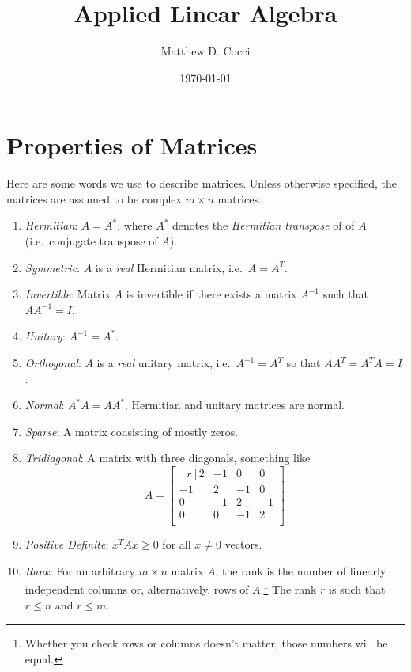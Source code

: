 \documentclass[12pt]{article}
\author{Matthew D. Cocci}
\title{Applied Linear Algebra}
\date{\today}
\theoremstyle{plain}
\theoremstyle{definition}
\theoremstyle{remark}
\begin{document}
\maketitle

\tableofcontents

\newpage
\section{Properties of Matrices}

Here are some words we use to describe matrices. Unless otherwise
specified, the matrices are assumed to be complex $m\times n$ matrices.
\begin{enumerate}
\item \emph{Hermitian}: $A=A^*$, where $A^*$ denotes the
  \emph{Hermitian transpose} of of $A$ (i.e.\ conjugate transpose of
  $A$).
\item \emph{Symmetric}: $A$ is a \emph{real} Hermitian matrix, i.e.\ $A
  = A^T$.
\item \emph{Invertible}: Matrix $A$ is invertible if there exists a matrix $A^{-1}$ such that $A A^{-1} = I$.
\item \emph{Unitary}: $A^{-1} = A^*$.
\item \emph{Orthogonal}: $A$ is a \emph{real} unitary matrix, i.e.\
  $A^{-1} = A^T$ so that $AA^T = A^T A = I$.
\item \emph{Normal}: $A^*A = AA^*$. Hermitian and unitary matrices are
  normal.
\item \emph{Sparse}: A matrix consisting of mostly zeros.
\item \emph{Tridiagonal}: A matrix with three diagonals, something like
\[
  A =
  \begin{bmatrix}[r]
   2 & -1 &  0 &  0 \\
  -1 & 2 & -1 &  0 \\
   0 & -1 &  2 & -1 \\
   0 &  0 & -1 &  2 \\
  \end{bmatrix}
\]
\item \emph{Positive Definite}: $x^T A x \geq 0$ for all $x\neq 0$ vectors.

\item \emph{Rank}: For an arbitrary $m\times n$ matrix $A$, the rank is the number of linearly independent columns or, alternatively, rows of $A$.\footnote{Whether you check rows or columns doesn't matter, those numbers will be equal.} The rank $r$ is such that $r \leq n$ and $r\leq m$.
\end{enumerate}
\end{document}
